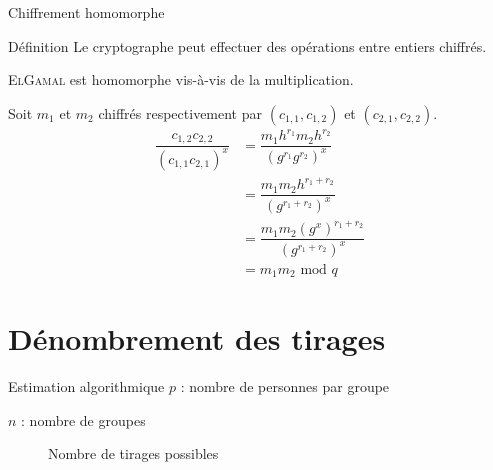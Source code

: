 \documentclass[10pt, compress]{beamer}
\begin{document}
  \begin{frame}{Chiffrement homomorphe}
    \begin{exampleblock}{Définition}
      Le cryptographe peut effectuer des opérations entre entiers chiffrés.

      \textsc{ElGamal} est homomorphe vis-à-vis de la multiplication.
    \end{exampleblock}
    Soit $m_1$ et $m_2$ chiffrés respectivement par $(c_{1, 1}, c_{1, 2})$ et $(c_{2, 1}, c_{2, 2})$.
    \begin{align*}
      \dfrac{c_{1, 2} c_{2, 2}}{(c_{1, 1} c_{2, 1})^x}
      &= \dfrac{m_1 h^{r_1} m_2  h^{r_2}}{(g^{r_1} g^{r_2})^x} \\
      &= \dfrac{m_1m_2 h^{r_1+r_2}}{(g^{r_1+r_2})^x} \\
      &= \dfrac{m_1m_2(g^x)^{r_1+r_2}}{(g^{r_1+r_2})^x} \\
      &= m_1m_2\text{ mod }q
    \end{align*}
  \end{frame}

\section{Dénombrement des tirages}

  \begin{frame}{Estimation algorithmique}
    $p$ : nombre de personnes par groupe 
    
    $n$ : nombre de groupes
    \begin{figure}
      \caption{Nombre de tirages possibles}
    \end{figure}
  \end{frame}
\end{document}
